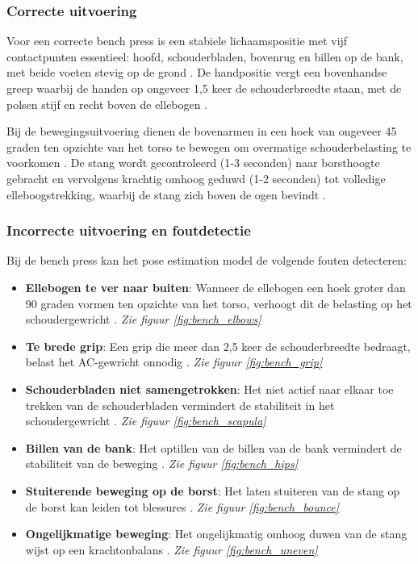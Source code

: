 \subsubsection{Correcte uitvoering}
Voor een correcte bench press is een stabiele lichaamspositie met vijf contactpunten essentieel: hoofd, schouderbladen, bovenrug en billen op de bank, met beide voeten stevig op de grond \autocite{Krol2010}. 
De handpositie vergt een bovenhandse greep waarbij de handen op ongeveer 1,5 keer de schouderbreedte staan, met de polsen stijf en recht boven de ellebogen \autocite{Noteboom2024}.

Bij de bewegingsuitvoering dienen de bovenarmen in een hoek van ongeveer 45 graden ten opzichte van het torso te bewegen om overmatige schouderbelasting te voorkomen \autocite{Ronai2018}. 
De stang wordt gecontroleerd (1-3 seconden) naar borsthoogte gebracht en vervolgens krachtig omhoog geduwd (1-2 seconden) tot volledige elleboogstrekking, waarbij de stang zich boven de ogen bevindt \autocite{Ronai2018}.

\subsubsection{Incorrecte uitvoering en foutdetectie}
Bij de bench press kan het pose estimation model de volgende fouten detecteren:

\begin{itemize}
    \item \textbf{Ellebogen te ver naar buiten}: Wanneer de ellebogen een hoek groter dan 90 graden vormen ten opzichte van het torso, verhoogt dit de belasting op het schoudergewricht \autocite{Ronai2018}. \textit{Zie figuur \ref{fig:bench_elbows}}
    
    \item \textbf{Te brede grip}: Een grip die meer dan 2,5 keer de schouderbreedte bedraagt, belast het AC-gewricht onnodig \autocite{Ronai2018}. \textit{Zie figuur \ref{fig:bench_grip}}
    
    \item \textbf{Schouderbladen niet samengetrokken}: Het niet actief naar elkaar toe trekken van de schouderbladen vermindert de stabiliteit in het schoudergewricht \autocite{Noteboom2024}. \textit{Zie figuur \ref{fig:bench_scapula}}
    
    \item \textbf{Billen van de bank}: Het optillen van de billen van de bank vermindert de stabiliteit van de beweging \autocite{Krol2010}. \textit{Zie figuur \ref{fig:bench_hips}}
    
    \item \textbf{Stuiterende beweging op de borst}: Het laten stuiteren van de stang op de borst kan leiden tot blessures \autocite{Bengtsson2018}. \textit{Zie figuur \ref{fig:bench_bounce}}
    
    \item \textbf{Ongelijkmatige beweging}: Het ongelijkmatig omhoog duwen van de stang wijst op een krachtonbalans \autocite{Krol2010}. \textit{Zie figuur \ref{fig:bench_uneven}}
\end{itemize}

